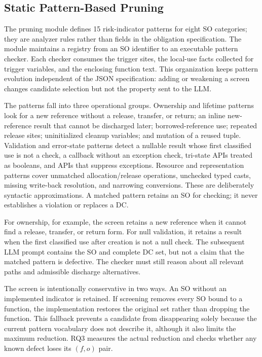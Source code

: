 \subsection{Static Pattern-Based Pruning}

The pruning module defines 15 risk-indicator patterns for eight SO categories;
they are analyzer rules rather than fields in the obligation specification.
The module maintains a registry from an SO identifier to an executable pattern
checker. Each checker consumes the trigger sites, the local-use facts collected
for trigger variables, and the enclosing function text. This organization
keeps pattern evolution independent of the JSON specification: adding or
weakening a screen changes candidate selection but not the property sent to the
LLM.

The patterns fall into three operational groups. Ownership and lifetime
patterns look for a new reference without a release, transfer, or return; an
inline new-reference result that cannot be discharged later; borrowed-reference
use; repeated release sites; uninitialized cleanup variables; and mutation of
a reused tuple. Validation and error-state patterns detect a nullable result
whose first classified use is not a check, a callback without an exception
check, tri-state APIs treated as booleans, and APIs that suppress exceptions.
Resource and representation patterns cover unmatched allocation/release
operations, unchecked typed casts, missing write-back resolution, and narrowing
conversions. These are deliberately syntactic approximations. A matched pattern
retains an SO for checking; it never establishes a violation or replaces a DC.

For ownership, for example, the screen retains a new reference when it cannot
find a release, transfer, or return form. For null validation, it retains a
result when the first classified use after creation is not a null check. The
subsequent LLM prompt contains the SO and complete DC set, but not a claim that
the matched pattern is defective. The checker must still reason about all
relevant paths and admissible discharge alternatives.

The screen is intentionally conservative in two ways. An SO without an
implemented indicator is retained. If screening removes every SO bound to a
function, the implementation restores the original set rather than dropping
the function. This fallback prevents a candidate from disappearing solely
because the current pattern vocabulary does not describe it, although it also
limits the maximum reduction. RQ3 measures the actual reduction and checks
whether any known defect loses its $(f,o)$ pair.

